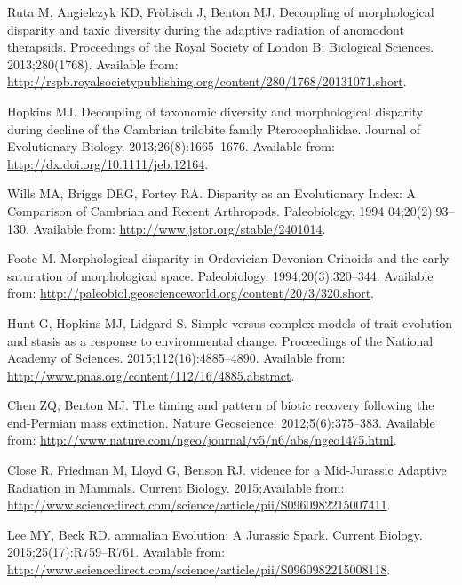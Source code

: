 \documentclass[12pt,letterpaper]{article}
\begin{document}
\begin{thebibliography}{10}
Ruta M, Angielczyk KD, Fr{\"o}bisch J, Benton MJ.
\newblock Decoupling of morphological disparity and taxic diversity during the
  adaptive radiation of anomodont therapsids.
\newblock Proceedings of the Royal Society of London B: Biological Sciences.
  2013;280(1768).
\newblock Available from:
  \url{http://rspb.royalsocietypublishing.org/content/280/1768/20131071.short}.

Hopkins MJ.
\newblock Decoupling of taxonomic diversity and morphological disparity during
  decline of the {C}ambrian trilobite family {P}terocephaliidae.
\newblock Journal of Evolutionary Biology. 2013;26(8):1665--1676.
\newblock Available from: \url{http://dx.doi.org/10.1111/jeb.12164}.

Wills MA, Briggs DEG, Fortey RA.
\newblock Disparity as an Evolutionary Index: A Comparison of {C}ambrian and
  Recent Arthropods.
\newblock Paleobiology. 1994 04;20(2):93--130.
\newblock Available from: \url{http://www.jstor.org/stable/2401014}.

Foote M.
\newblock Morphological disparity in {O}rdovician-{D}evonian {C}rinoids and the
  early saturation of morphological space.
\newblock Paleobiology. 1994;20(3):320--344.
\newblock Available from:
  \url{http://paleobiol.geoscienceworld.org/content/20/3/320.short}.

Hunt G, Hopkins MJ, Lidgard S.
\newblock Simple versus complex models of trait evolution and stasis as a
  response to environmental change.
\newblock Proceedings of the National Academy of Sciences.
  2015;112(16):4885--4890.
\newblock Available from:
  \url{http://www.pnas.org/content/112/16/4885.abstract}.

Chen ZQ, Benton MJ.
\newblock The timing and pattern of biotic recovery following the end-{P}ermian
  mass extinction.
\newblock Nature Geoscience. 2012;5(6):375--383.
\newblock Available from:
  \url{http://www.nature.com/ngeo/journal/v5/n6/abs/ngeo1475.html}.

Close R, Friedman M, Lloyd G, Benson RJ.
vidence for a Mid-{J}urassic Adaptive Radiation in Mammals.
\newblock Current Biology. 2015;Available from:
  \url{http://www.sciencedirect.com/science/article/pii/S0960982215007411}.

Lee MY, Beck RD.
ammalian Evolution: A {J}urassic Spark.
\newblock Current Biology. 2015;25(17):R759--R761.
\newblock Available from:
  \url{http://www.sciencedirect.com/science/article/pii/S0960982215008118}.


\end{thebibliography}
\end{document}
